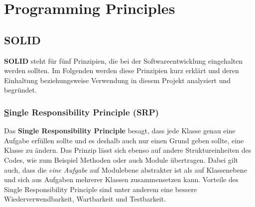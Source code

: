 \chapter{Programming Principles}

\section{SOLID}

\textbf{SOLID} steht für fünf Prinzipien, die bei der Softwareentwicklung eingehalten werden sollten. 
Im Folgenden werden diese Prinzipien kurz erklärt und deren Einhaltung beziehungsweise Verwendung in diesem Projekt analysiert und begründet.


\subsection{\underline{S}ingle Responsibility Principle (SRP)}

Das \textbf{Single Responsibility Principle} besagt, dass jede Klasse genau eine Aufgabe erfüllen sollte und es deshalb auch nur einen Grund geben sollte, eine Klasse zu ändern.
Das Prinzip lässt sich ebenso auf andere Struktureinheiten des Codes, wie zum Beispiel Methoden oder auch Module übertragen.
Dabei gilt auch, dass die \textit{eine Aufgabe} auf Modulebene abstrakter ist als auf Klassenebene und sich aus Aufgaben mehrerer Klassen zusammensetzen kann.
\newline
Vorteile des Single Responsibility Principle sind unter anderem eine bessere Wiederverwendbarkeit, Wartbarkeit  und Testbarkeit.


